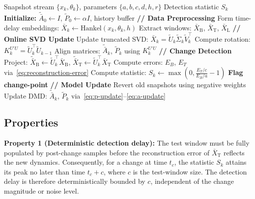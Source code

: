 \documentclass[conference]{IEEEtran}
\newcommand{\ui}[2]{#1_{\mathrm{#2}}}
\begin{document}
\begin{algorithm}[t]
    \caption{toDMDc-based Change-Point Detection}\label{alg:cpd-todmdc}
    \begin{algorithmic}[1]
        \REQUIRE Snapshot stream \(\{x_k, \theta_k\}\), parameters \(\{a,b,c,d,h,r\}\)
        \ENSURE Detection statistic \(S_k\)
        \STATE \textbf{Initialize:} \(\tilde{\bar{A}}_0 \gets I\), \(\tilde{P}_0 \gets \alpha I\), history buffer
        \STATE \textbf{// Data Preprocessing}
        \STATE Form time-delay embeddings: \(\bar{X}_k \gets \text{Hankel}(x_k, \theta_k, h)\)
        \STATE Extract windows: \(\ui{\bar{X}}{B}\), \(\ui{\bar{X}}{T}\), \(\ui{\bar{X}}{L}\)
        \STATE \textbf{// Online SVD Update}
        \STATE Update truncated SVD: \(\bar{X}_k = \tilde{U}_k \tilde{\Sigma}_k \tilde{V}_k^\top\)
        \STATE Compute rotation: \(K^{U'U}_k = \tilde{U}_k^\top \tilde{U}_{k-1}\)
        \STATE Align matrices: \(\tilde{\bar{A}}_k\), \(\tilde{P}_k\) using \(K^{U'U}_k\)
        \STATE \textbf{// Change Detection}
        \STATE Project: \(\ui{\tilde{\bar{X}}}{B} \gets \tilde{U}_k^\top \ui{\bar{X}}{B}\), \(\ui{\tilde{\bar{X}}}{T} \gets \tilde{U}_k^\top \ui{\bar{X}}{T}\)
        \STATE Compute errors: \(E_B\), \(E_T\) via~\eqref{eq:reconstruction-error}
        \STATE Compute statistic: \(S_k \gets \max(0, \frac{E_T/c}{E_B/a} - 1)\)
        \STATE \textbf{Flag change-point}
        \ENDIF
        \STATE \textbf{// Model Update}
        \STATE Revert old snapshots using negative weights
        \ENDIF
        \STATE Update DMD: \(\tilde{\bar{A}}_k\), \(\tilde{P}_k\) via~\eqref{eq:p-update}--\eqref{eq:a-update}
        \ENDFOR
    \end{algorithmic}
\end{algorithm}

\subsection{Properties}

\textbf{Property 1 (Deterministic detection delay):} The test window must be fully populated by post-change samples before the reconstruction error of \(\ui{\bar{X}}{T}\) reflects the new dynamics. Consequently, for a change at time \(t_c\), the statistic \(S_k\) attains its peak no later than time \(t_c + c\), where \(c\) is the test-window size. The detection delay is therefore deterministically bounded by \(c\), independent of the change magnitude or noise level.
\end{document}
